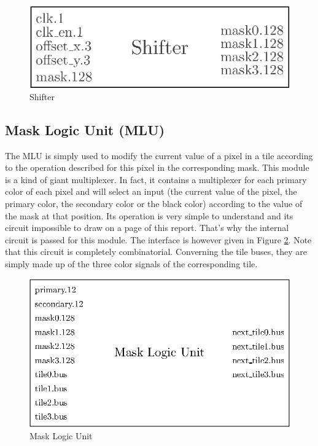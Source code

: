\begin{figure}[H]
    \centering
    \includegraphics[scale=1.0]{Chapter4-GPU_CLKU/res/shifter}
    \caption{Shifter}
    \label{fig:gpu/shifter}
\end{figure}


\subsection{Mask Logic Unit (MLU)}

The MLU is simply used to modify the current value of a pixel in a tile according to the operation 
described for this pixel in the corresponding mask. This module is a kind of giant multiplexer. In 
fact, it contains a multiplexer for each primary color of each pixel and will select an input 
(the current value of the pixel, the primary color, the secondary color or the black color) 
according to the value of the mask at that position. Its operation is very simple to understand 
and its circuit impossible to draw on a page of this report. That's why the internal circuit is 
passed for this module. The interface is however given in Figure \ref{fig:gpu/mlu}.
Note that this circuit is completely combinatorial. Converning the tile buses, they are simply
made up of the three color signals of the corresponding tile.

\begin{figure}[H]
    \centering
    \includegraphics[scale=1.0]{Chapter4-GPU_CLKU/res/mlu}
    \caption{Mask Logic Unit}
    \label{fig:gpu/mlu}
\end{figure}



